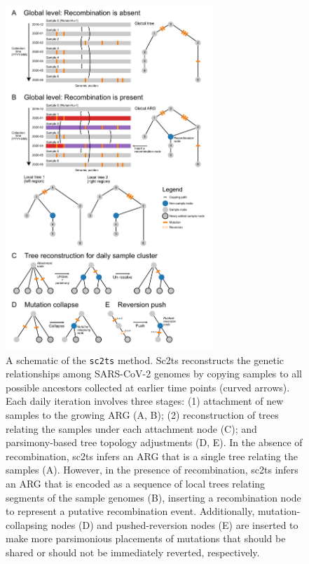 \documentclass{article}
\begin{document}
\begin{figure} \centering
\includegraphics[width=0.7\textwidth]{figures/overview_sc2ts.pdf}
\caption{\label{fig:overview_sc2ts}
A schematic of the \texttt{sc2ts} method.
Sc2ts reconstructs the genetic relationships
among SARS-CoV-2 genomes by copying samples to all possible ancestors collected
at earlier time points (curved arrows). Each daily iteration involves three stages:
(1) attachment of new samples to the growing ARG (A, B); (2) reconstruction of
trees relating the samples under each attachment node (C); and parsimony-based
tree topology adjustments (D, E). In the absence of  recombination, sc2ts
infers an ARG that is a single tree relating the samples (A). However, in the
presence of recombination, sc2ts infers an ARG that is encoded as a sequence of
local trees relating segments of the sample genomes (B), inserting a
recombination node to represent a putative recombination event. Additionally,
mutation-collapsing nodes (D) and pushed-reversion nodes (E) are inserted to
make more parsimonious placements of mutations that should be shared or should
not be immediately reverted, respectively.}
\end{figure}
\end{document}
